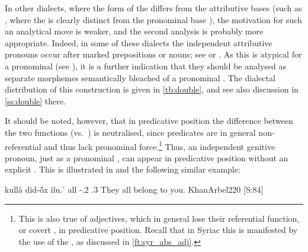 In other dialects, where the form of the \lnk* differs from the attributive bases (such as \JUrm, where the \lnk* {} is clearly distinct from the pronominal base ), the motivation for such an analytical move is weaker, and the second analysis is probably more appropriate. Indeed, in some of these dialects the independent attributive pronouns  occur after \cst* marked prepositions or nouns; see \JUrm {} or \Barz {}. As this is atypical for a pronominal \lnk* (see ), it is a further indication that they should be analysed as separate morphemes semantically bleached of a pronominal \prim. The    dialectal distribution of this construction is given in \vref{tb:double}, and see also discussion in \ref{ss:double} there.

It should be noted, however, that in predicative position the difference between the two functions (\lnk* vs.\ \gen*) is neutralised, since predicates are in general non-referential and thus lack pronominal force.\footnote{This is also true of adjectives, which in general lose their referential function, or covert , in predicative position. Recall that in Syriac this is manifested by the use of the \abs*, as discussed in \vref{ft:syr_abs_adj}.} Thus,  an independent genitive pronoun, just as a pronominal \lnk*, can appear in predicative position without an explicit \prim. This is illustrated in \JUrm {} and the following similar \Arb example: 


{kullà \zero{} did-ŏ́x \cb{}ilu.ˈ}
{all \zero{} \gen-\poss.2\masc{} \cb{}\cop.3\pl}
{They all belong to you.}
{KhanArbel}{220 {[S:84]}}




